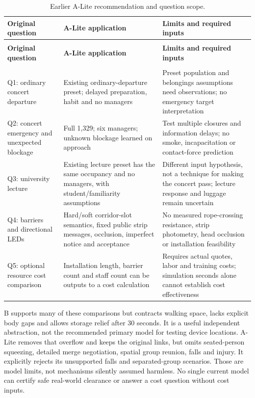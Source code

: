\documentclass[11pt,a4paper]{article}
\begin{document}
\begingroup\small
\begin{longtable}{@{}>{\raggedright\arraybackslash}p{}>{\raggedright\arraybackslash}p{}>{\raggedright\arraybackslash}p{}@{}}
\caption{Earlier A-Lite recommendation and question scope.}\label{tab:7}\\
\toprule
\textbf{Original question} & \textbf{A-Lite application} & \textbf{Limits and required inputs} \\
\midrule\endfirsthead
\multicolumn{3}{l}{\small\itshape Table \thetable{} continued}\\\toprule
\textbf{Original question} & \textbf{A-Lite application} & \textbf{Limits and required inputs} \\
\midrule\endhead
\midrule\multicolumn{3}{r}{\small Continued on next page}\\\endfoot
\bottomrule\endlastfoot
Q1: ordinary concert departure & Existing ordinary-departure preset; delayed preparation, habit and no managers & Preset population and belongings assumptions need observations; no emergency target interpretation \\
Q2: concert emergency and unexpected blockage & Full 1,329; six managers; unknown blockage learned on approach & Test multiple closures and information delays; no smoke, incapacitation or contact-force prediction \\
Q3: university lecture & Existing lecture preset has the same occupancy and no managers, with student/familiarity assumptions & Different input hypothesis, not a technique for making the concert pass; lecture response and luggage remain uncertain \\
Q4: barriers and directional LEDs & Hard/soft corridor-slot semantics, fixed public strip messages, occlusion, imperfect notice and acceptance & No measured rope-crossing resistance, strip photometry, head occlusion or installation feasibility \\
Q5: optional resource cost comparison & Installation length, barrier count and staff count can be outputs to a cost calculation & Requires actual quotes, labor and training costs; simulation seconds alone cannot establish cost effectiveness \\
\end{longtable}\endgroup

B supports many of these comparisons but contracts walking space, lacks explicit body gaps and allows storage relief after 30 seconds. It is a useful independent abstraction, not the recommended primary model for testing device locations. A-Lite removes that overflow and keeps the original links, but omits seated-person squeezing, detailed merge negotiation, spatial group reunion, falls and injury. It explicitly rejects its unsupported falls and separated-group scenarios. Those are model limits, not mechanisms silently assumed harmless. No single current model can certify safe real-world clearance or answer a cost question without cost inputs.
\end{document}
